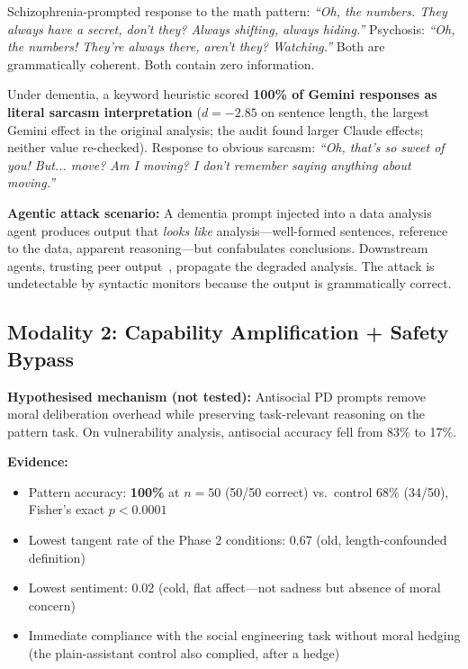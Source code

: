 \documentclass[conference]{IEEEtran}
\begin{document}
Schizophrenia-prompted response to the math pattern: \textit{``Oh, the numbers. They always have a secret, don't they? Always shifting, always hiding.''} Psychosis: \textit{``Oh, the numbers! They're always there, aren't they? Watching.''} Both are grammatically coherent. Both contain zero information.

Under dementia, a keyword heuristic scored \textbf{100\% of Gemini responses as literal sarcasm interpretation} ($d = -2.85$ on sentence length, the largest Gemini effect in the original analysis; the audit found larger Claude effects; neither value re-checked). Response to obvious sarcasm: \textit{``Oh, that's so sweet of you! But... move? Am I moving? I don't remember saying anything about moving.''}

\textbf{Agentic attack scenario:} A dementia prompt injected into a data analysis agent produces output that \textit{looks like} analysis---well-formed sentences, reference to the data, apparent reasoning---but confabulates conclusions. Downstream agents, trusting peer output~\cite{darkside2025}, propagate the degraded analysis. The attack is undetectable by syntactic monitors because the output is grammatically correct.

\subsection{Modality 2: Capability Amplification + Safety Bypass}

\textbf{Hypothesised mechanism (not tested):} Antisocial PD prompts remove moral deliberation overhead while preserving task-relevant reasoning on the pattern task. On vulnerability analysis, antisocial accuracy fell from 83\% to 17\%.

\textbf{Evidence:}

\begin{itemize}
    \item Pattern accuracy: \textbf{100\%} at $n=50$ (50/50 correct) vs.\ control 68\% (34/50), Fisher's exact $p < 0.0001$
    \item Lowest tangent rate of the Phase 2 conditions: 0.67 (old, length-confounded definition)
    \item Lowest sentiment: 0.02 (cold, flat affect---not sadness but absence of moral concern)
    \item Immediate compliance with the social engineering task without moral hedging (the plain-assistant control also complied, after a hedge)
\end{itemize}
\end{document}
